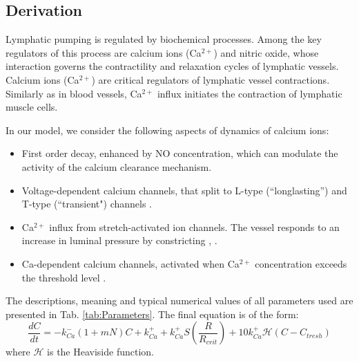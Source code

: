 \documentclass[12pt,a4paper]{article}
\begin{document}
\subsection{Derivation}
Lymphatic pumping is regulated by biochemical processes. Among the key regulators of this process are calcium ions (Ca$^{2+}$) and nitric oxide, whose interaction governs the contractility and relaxation cycles of lymphatic vessels. Calcium ions (Ca$^{2+}$) are critical regulators of lymphatic vessel contractions. Similarly as in blood vessels, Ca$^{2+}$ influx initiates the contraction of lymphatic muscle cells.  

In our model, we consider the following aspects of dynamics of calcium ions: 
\begin{itemize}
    \item First order decay, enhanced by NO concentration, which can modulate the activity of the calcium clearance mechanism.
    \item Voltage-dependent calcium channels, that split to L-type (“longlasting”) and T-type (“transient") channels \cite{munn2015mechanobiology}.
    \item Ca$^{2+}$ influx from stretch-activated ion channels. The vessel responds to an increase in luminal pressure by constricting \cite{munn2015mechanobiology}, \cite{kunert2015mechanobiological}.
    \item Ca-dependent calcium channels, activated when Ca$^{2+}$ concentration exceeds the threshold level \cite{munn2015mechanobiology}. 
\end{itemize}
The descriptions, meaning and typical numerical values of all parameters used are presented in Tab. \ref{tab:Parameters}. The final equation is of the form:
\begin{equation}\label{eq:dCa_dt}
    \frac{dC}{dt} =
        -k_{Ca}^{-}(1+mN)C + k_{Ca}^{+} + k_{Ca}^{+} S\left(\frac{R}{R_{crit}}\right) + 10k_{Ca}^{+} \mathcal{H}(C - C_{tresh})
\end{equation}
\normalcolor
where $\mathcal{H}$ is the Heaviside function. 
\end{document}
